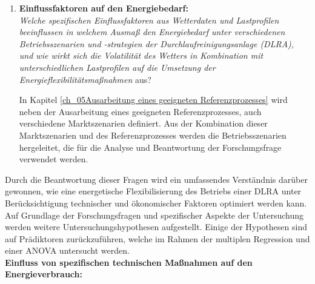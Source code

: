 \begin{enumerate}[label=\textbf{\arabic*.}]
	\item \textbf{Einflussfaktoren auf den Energiebedarf:}\\\emph{Welche spezifischen Einflussfaktoren aus Wetterdaten und Lastprofilen beeinflussen in welchem Ausmaß den Energiebedarf unter verschiedenen Betriebsszenarien und -strategien der Durchlaufreinigungsanlage (DLRA), und wie wirkt sich die Volatilität des Wetters in Kombination mit unterschiedlichen Lastprofilen auf die Umsetzung der Energieflexibilitätsmaßnahmen} aus?
	
	In Kapitel \ref{ch_05Ausarbeitung eines geeigneten Referenzprozesses} wird neben der Ausarbeitung eines geeigneten Referenzprozesses, auch verschiedene Marktszenarien definiert. Aus der Kombination dieser Marktszenarien und des Referenzprozesses werden die Betriebsszenarien hergeleitet, die für die Analyse und Beantwortung der Forschungsfrage verwendet werden. 
	
\end{enumerate}

Durch die Beantwortung dieser Fragen wird ein umfassendes Verständnis darüber gewonnen, wie eine energetische Flexibilisierung des Betriebs einer DLRA unter Berücksichtigung technischer und ökonomischer Faktoren optimiert werden kann.\\

Auf Grundlage der Forschungsfragen und spezifischer Aspekte der Untersuchung werden weitere Untersuchungshypothesen aufgestellt. Einige der Hypothesen sind auf Prädiktoren zurückzuführen, welche im Rahmen der multiplen Regression und einer ANOVA untersucht werden.\\

\textbf{Einfluss von spezifischen technischen Maßnahmen auf den Energieverbrauch:}

